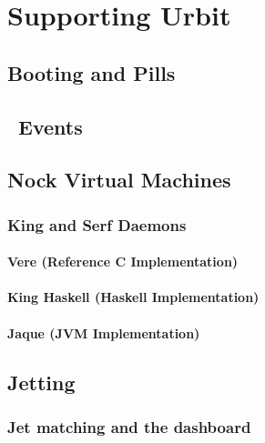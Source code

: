 \setchapterpreamble[u]{\margintoc}
\chapter{Supporting Urbit}


\section{Booting and Pills}

\section{\unix~Events}

\section{Nock Virtual Machines}

\subsection{\mock}

\subsection{King and Serf Daemons}

\subsubsection{Vere (Reference C Implementation)}

\subsubsection{King Haskell (Haskell Implementation)}

\subsubsection{Jaque (JVM Implementation)}

\section{Jetting}

\subsection{Jet matching and the dashboard}
